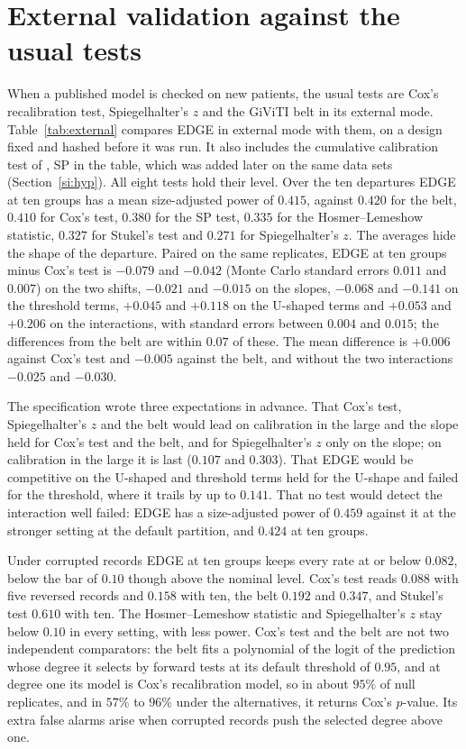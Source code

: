 \documentclass[11pt]{article}
\begin{document}


\section{External validation against the usual tests}\label{si:external}

When a published model is checked on new patients, the usual tests are Cox's recalibration test,
Spiegelhalter's $z$ and the GiViTI belt in its external mode. Table~\ref{tab:external} compares 
EDGE in external mode with them, on a design fixed and hashed before it was run. It also includes the
cumulative calibration test of \citet{sadatsafavi2024nonparametric}, SP in the table, which was added
later on the same data sets (Section~\ref{si:hyp}). All eight
tests hold their level. Over the ten departures EDGE at ten groups has a mean size-adjusted
power of $0.415$, against $0.420$ for the belt, $0.410$ for Cox's test, $0.380$ for the SP test, $0.335$ for
the Hosmer--Lemeshow statistic, $0.327$ for Stukel's test and $0.271$ for Spiegelhalter's $z$. The averages hide the shape of
the departure. Paired on the same replicates, EDGE at ten groups minus Cox's test is $-0.079$ and
$-0.042$ (Monte Carlo standard errors $0.011$ and $0.007$) on the two shifts, $-0.021$ and $-0.015$ on
the slopes, $-0.068$ and $-0.141$ on the threshold terms, $+0.045$ and $+0.118$ on the U-shaped terms
and $+0.053$ and $+0.206$ on the interactions, with standard errors between $0.004$ and $0.015$; the
differences from the belt are within $0.07$ of these. The mean difference is $+0.006$ against Cox's test
and $-0.005$ against the belt, and without the two interactions $-0.025$ and $-0.030$.

The specification wrote three expectations in advance. That Cox's test, Spiegelhalter's $z$ and the belt
would lead on calibration in the large and the slope held for Cox's test and the belt, and for
Spiegelhalter's $z$ only on the slope; on calibration in the large it is last ($0.107$ and $0.303$). That
EDGE would be competitive on the U-shaped and threshold terms held for the U-shape and failed for the
threshold, where it trails by up to $0.141$. That no test would detect the interaction well failed:
EDGE has a size-adjusted power of $0.459$ against it at the stronger setting at the default partition,
and $0.424$ at ten groups.

Under corrupted records EDGE at ten groups keeps every rate at or below $0.082$, below the bar of
$0.10$ though above the nominal level. Cox's test reads $0.088$ with five reversed records and $0.158$
with ten, the belt $0.192$ and $0.347$, and Stukel's test $0.610$ with ten. The Hosmer--Lemeshow
statistic and Spiegelhalter's $z$ stay below $0.10$ in every setting, with less power. Cox's test and the
belt are not two independent comparators: the belt fits a polynomial of the logit of the prediction
whose degree it selects by forward tests at its default threshold of $0.95$, and at degree one its model is Cox's
recalibration model, so in about $95\%$ of null replicates, and in $57\%$ to $96\%$ under the
alternatives, it returns Cox's $p$-value. Its extra false alarms arise when corrupted records push the
selected degree above one.
\end{document}
